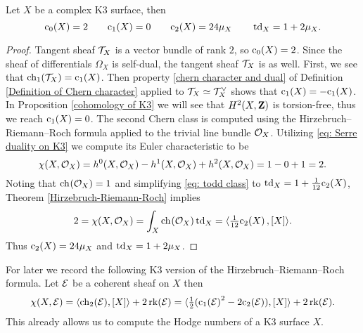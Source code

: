 \begin{proposition}
    \label{characteristic classes of K3}
    Let $X$ be a complex K3 surface, then
    \[
        \cclass[0](X) = 2 \qquad \cclass[1](X) = 0 \qquad \cclass[2](X) = 24\mu_X  \qquad \tdclass{X} = 1 + 2\mu_X.
    \]
\end{proposition}

\begin{proof}
    Tangent sheaf $\mathcal{T}_{X}$ is a vector bundle of rank $2$, so $\cclass[0](X) = 2$. Since the sheaf of differentials $\Omega_X$ is self-dual, the tangent sheaf $\mathcal{T}_{X}$ is as well. First, we see that $\ch[1](\tangent{X}) = \cclass[1](X)$. Then property \ref{chern character and dual} of Definition \ref{Definition of Chern character} applied to $\mathcal{T}_{X} \simeq \mathcal{T}_{X}^\vee$ shows that $\cclass[1](X) = -\cclass[1](X)$. In Proposition \ref{cohomology of K3} we will see that $H^{2}(X, \mathbf Z)$ is torsion-free, thus we reach $\cclass[1](X) = 0$. The second Chern class is computed using the Hirzebruch--Riemann--Roch formula applied to the trivial line bundle ${\mathcal{O}_{X}}$. Utilizing \eqref{eq: Serre duality on K3} we compute its Euler characteristic to be 
    \[
        \chi(X, {\mathcal{O}_{X}}) = h^0(X, {\mathcal{O}_{X}}) - h^1(X, {\mathcal{O}_{X}}) + h^2(X, {\mathcal{O}_{X}}) = 1 - 0 + 1 = 2.
    \]
    Noting that $\ch[]{\struct{X}} = 1$ and simplifying \eqref{eq: todd class} to $\td_X = 1 + \frac{1}{12}\cclass[2]{X}$, Theorem \ref{Hirzebruch-Riemann-Roch} implies
    \[
        2 = \chi(X, \struct{X}) = \int_X \ch[]{\struct{X}}\tdclass{X} = \pairing{\tfrac{1}{12}\cclass[2]{X}}{[X]}.
    \]
    Thus $\cclass[2](X) = 24 \mu_X$ and $\operatorname{td}_{X} = 1 + 2\mu_X$.
\end{proof}

For later we record the following K3 version of the Hirzebruch--Riemann--Roch formula. Let $\mathcal E$ be a coherent sheaf on $X$ then 
\begin{equation}
    \label{eq: HRR for K3}
    \chi(X, \E) = \pairing{\ch[2](\E)}{[X]} + 2\rk{\E} = \pairing{\tfrac{1}{2}(\cclass[1]{\E}^2 - 2\cclass[2]{\E})}{[X]} + 2 \rk{\E}.
\end{equation}
This already allows us to compute the Hodge numbers of a K3 surface $X$.

